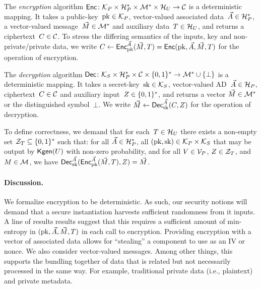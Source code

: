 The \emph{encryption} algorithm ${\mathsf{Enc}} \colon \mathcal{K}_P \times \mathcal{H}_P^* \times \mathcal{M}^* \times \mathcal{H}_U \to \mathcal{C}$ is a deterministic mapping.  It takes a public-key~$\mathrm{pk}\in\mathcal{K}_P$, vector-valued associated data~$\vec{A} \in \mathcal{H}_P^*$,  a vector-valued message~$\vec{M} \in \mathcal{M}^*$ and auxiliary data~$T \in \mathcal{H}_U$, and returns a ciphertext~$C \in \mathcal{C}$. 
To stress the differing semantics of the inputs, key and non-private/private data, we write $C\gets{\mathsf{Enc}}_{\mathrm{pk}}^{\vec{A}}(\vec{M},T) ={\mathsf{Enc}}(\mathrm{pk},\vec{A}, \vec{M},T)$ for the operation of encryption. 


The \emph{decryption} algorithm ${\mathsf{Dec}} \colon \mathcal{K}_S \times \mathcal{H}_P^* \times \mathcal{C} \times \{0,1\}^* \to \mathcal{M}^* \cup \{\bot\}$ is a deterministic mapping.  It takes a secret-key~$\mathrm{sk}\in\mathcal{K}_S$, vector-valued AD~$\vec{A} \in \mathcal{H}_P$, ciphertext~$C \in \mathcal{C}$ and auxiliary input~$Z\in\{0,1\}^*$, and returns a vector $\vec{M} \in \mathcal{M}^*$ or the distinguished symbol~$\bot$.  We write $\vec{M} \gets {\mathsf{Dec}}_{\mathrm{sk}}^{\vec{A}}(C,Z)$ for the operation of decryption.   

To define correctness, we demand that for each~$T\in\mathcal{H}_U$ there exists a non-empty set $\mathcal{Z}_T \subseteq \{0,1\}^*$ such that:  for all $\vec{A}\in\mathcal{H}_P^*$, all $(\mathrm{pk},\mathrm{sk})\in\mathcal{K}_P\times\mathcal{K}_S$ that may be output by $\mathsf{Kgen}(U)$ with non-zero probability, and for all $V\in\mathcal{V}_P$, $Z\in\mathcal{Z}_T$,  and $M\in\mathcal{M}$, we have ${\mathsf{Dec}}_{\mathrm{sk}}^{\vec{A}}({\mathsf{Enc}}_{\mathrm{pk}}^{\vec{A}}(\vec{M},T),Z)=\vec{M}$. 

\paragraph{Discussion. } We formalize encryption to be deterministic.  As such, our security notions will demand that a secure instantiation harvests sufficient randomness from it inputs.  A line of results \cite{xxx,yyy,zzz} results suggest that this requires a sufficient amount of min-entropy in $(\mathrm{pk},\vec{A},\vec{M},T)$ in each call to encryption.  Providing encryption with a vector of associated data allows for ``stealing'' a component to use as an IV or nonce.  We also consider vector-valued messages.  Among other things, this supports the bundling together of data that is related but not necessarily processed in the same way.  For example, traditional private data (i.e., plaintext) and private metadata.  

